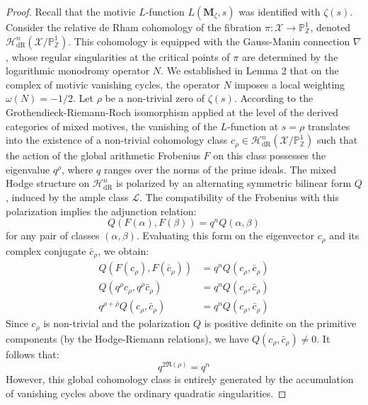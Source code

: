 \documentclass[
]{article}
\begin{document}
\begin{proof}
Recall that the motivic $L$-function $L(\mathbf{M}_{\zeta}, s)$ was identified with $\zeta(s)$.
Consider the relative de Rham cohomology of the fibration $\pi : \mathcal{X} \to \mathbb{P}^1_{\mathbb{Z}}$, denoted $\mathcal{H}^n_{\mathrm{dR}}(\mathcal{X}/\mathbb{P}^1_{\mathbb{Z}})$.
This cohomology is equipped with the Gauss-Manin connection $\nabla$, whose regular singularities at the critical points of $\pi$ are determined by the logarithmic monodromy operator $N$.
We established in Lemma 2 that on the complex of motivic vanishing cycles, the operator $N$ imposes a local weighting $\omega(N) = -1/2$.
Let $\rho$ be a non-trivial zero of $\zeta(s)$.
According to the Grothendieck-Riemann-Roch isomorphism applied at the level of the derived categories of mixed motives, the vanishing of the $L$-function at $s = \rho$ translates into the existence of a non-trivial cohomology class $c_{\rho} \in \mathcal{H}^n_{\mathrm{dR}}(\mathcal{X}/\mathbb{P}^1_{\mathbb{Z}})$ such that the action of the global arithmetic Frobenius $F$ on this class possesses the eigenvalue $q^{\rho}$, where $q$ ranges over the norms of the prime ideals.
The mixed Hodge structure on $\mathcal{H}^n_{\mathrm{dR}}$ is polarized by an alternating symmetric bilinear form $Q$, induced by the ample class $\mathcal{L}$.
The compatibility of the Frobenius with this polarization implies the adjunction relation:
\begin{equation*}
Q(F(\alpha), F(\beta)) = q^{n} Q(\alpha, \beta)
\end{equation*}
for any pair of classes $(\alpha, \beta)$.
Evaluating this form on the eigenvector $c_{\rho}$ and its complex conjugate $\bar{c}_{\rho}$, we obtain:
\begin{align*}
Q(F(c_{\rho}), F(\bar{c}_{\rho})) &= q^n Q(c_{\rho}, \bar{c}_{\rho}) \\
Q(q^{\rho} c_{\rho}, q^{\bar{\rho}} \bar{c}_{\rho}) &= q^n Q(c_{\rho}, \bar{c}_{\rho}) \\
q^{\rho + \bar{\rho}} Q(c_{\rho}, \bar{c}_{\rho}) &= q^n Q(c_{\rho}, \bar{c}_{\rho})
\end{align*}
Since $c_{\rho}$ is non-trivial and the polarization $Q$ is positive definite on the primitive components (by the Hodge-Riemann relations), we have $Q(c_{\rho}, \bar{c}_{\rho}) \neq 0$.
It follows that:
\begin{equation*}
q^{2\Re(\rho)} = q^n
\end{equation*}
However, this global cohomology class is entirely generated by the accumulation of vanishing cycles above the ordinary quadratic singularities.

\end{proof}
\end{document}
